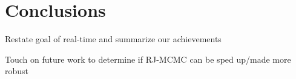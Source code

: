 \section{Conclusions}
\label{sec:conc}

Restate goal of real-time and summarize our achievements

Touch on future work to determine if RJ-MCMC can be sped up/made more robust